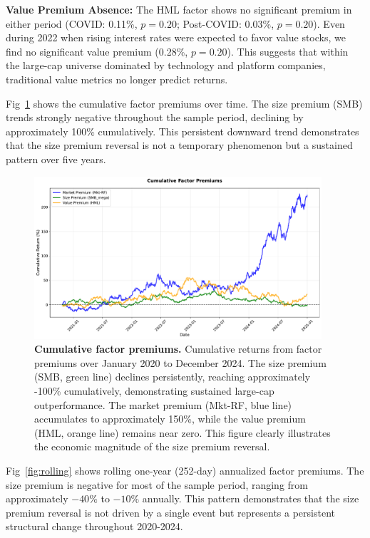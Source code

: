 \documentclass[10pt,letterpaper]{article}
\begin{document}
\textbf{Value Premium Absence:} The HML factor shows no significant premium in either period (COVID: 0.11\%, $p=0.20$; Post-COVID: 0.03\%, $p=0.20$). Even during 2022 when rising interest rates were expected to favor value stocks, we find no significant value premium (0.28\%, $p=0.20$). This suggests that within the large-cap universe dominated by technology and platform companies, traditional value metrics no longer predict returns.

Fig~\ref{fig:cumulative} shows the cumulative factor premiums over time. The size premium (SMB) trends strongly negative throughout the sample period, declining by approximately 100\% cumulatively. This persistent downward trend demonstrates that the size premium reversal is not a temporary phenomenon but a sustained pattern over five years.

\begin{figure}[!h]
\centering
\includegraphics[width=0.95\textwidth]{figures/fig4_cumulative_returns.pdf}
\caption{\textbf{Cumulative factor premiums.}
Cumulative returns from factor premiums over January 2020 to December 2024. The size premium (SMB, green line) declines persistently, reaching approximately -100\% cumulatively, demonstrating sustained large-cap outperformance. The market premium (Mkt-RF, blue line) accumulates to approximately 150\%, while the value premium (HML, orange line) remains near zero. This figure clearly illustrates the economic magnitude of the size premium reversal.}
\label{fig:cumulative}
\end{figure}

Fig~\ref{fig:rolling} shows rolling one-year (252-day) annualized factor premiums. The size premium is negative for most of the sample period, ranging from approximately $-40\%$ to $-10\%$ annually. This pattern demonstrates that the size premium reversal is not driven by a single event but represents a persistent structural change throughout 2020-2024.
\end{document}
